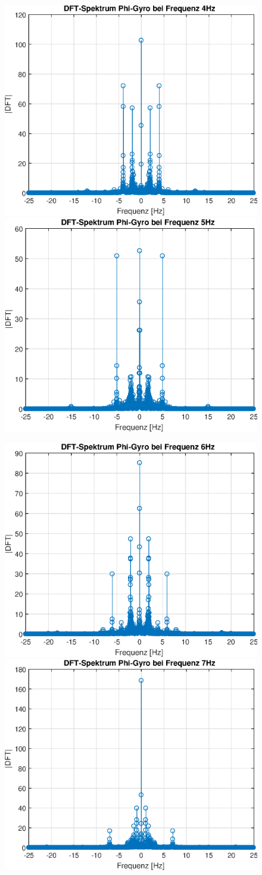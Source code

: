 \documentclass{article}
\begin{document}
\begin{figure}[h!]
\includegraphics[width=0.5\linewidth]{img/dft_phi_g_5}
\includegraphics[width=0.5\linewidth]{img/dft_phi_g_6}
\end{figure}
\newpage
\begin{figure}[h!]
\includegraphics[width=0.5\linewidth]{img/dft_phi_g_7}
\includegraphics[width=0.5\linewidth]{img/dft_phi_g_8}
\end{figure}
\end{document}
